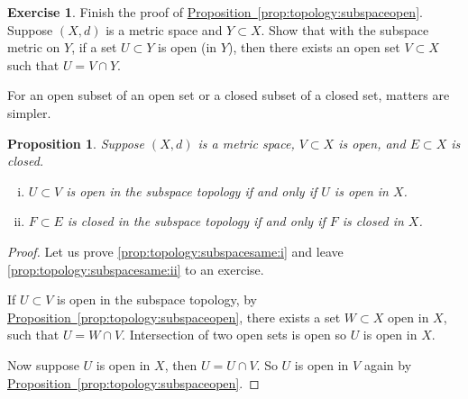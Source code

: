 \documentclass[12pt,openany]{book}
\theoremstyle{plain}
\newtheorem{prop}[thm]{Proposition}
\theoremstyle{remark}
\theoremstyle{definition}
\newenvironment{exbox}{%
    \def\FrameCommand{\vrule width 1pt \relax\hspace{10pt}}%
    \MakeFramed{\advance\hsize-\width\FrameRestore}%
}{%
    \endMakeFramed
}
\theoremstyle{exercise}
\newtheorem{exercise}{Exercise}[section]
\theoremstyle{example}
\newcommand{\propref}[1]{\hyperref[#1]{Proposition~\ref*{#1}}}
\begin{document}
\begin{exbox}
\begin{exercise}
Finish the proof of \propref{prop:topology:subspaceopen}.
Suppose $(X,d)$ is a metric space and $Y \subset X$.  Show that
with the subspace metric on $Y$, if a set $U \subset Y$
is open (in $Y$), then there exists an open set $V \subset X$ such
that $U = V \cap Y$.
\end{exercise}
\end{exbox}

For an open subset of an open set or a closed subset of a closed
set, matters are simpler.

\begin{prop} \label{prop:topology:subspacesame}
Suppose $(X,d)$ is a metric space, $V \subset X$ is open,
and $E \subset X$ is closed.
\begin{enumerate}[(i)]
\item \label{prop:topology:subspacesame:i}
$U \subset V$ is open in the subspace topology if and only if $U$ is open
in $X$.
\item \label{prop:topology:subspacesame:ii}
$F \subset E$ is closed in the subspace topology if and only if $F$ is
closed in $X$.
\end{enumerate}
\end{prop}

\begin{proof}
Let us prove
\ref{prop:topology:subspacesame:i}
and leave 
\ref{prop:topology:subspacesame:ii} to an exercise.

If $U \subset V$ is open in the subspace topology, by
\propref{prop:topology:subspaceopen}, there exists a set $W \subset X$
open in $X$, such that $U = W \cap V$.  Intersection of two open sets
is open so $U$ is open in $X$.

Now suppose $U$ is open in $X$, then $U = U \cap V$. So
$U$ is open in $V$ again by \propref{prop:topology:subspaceopen}.
\end{proof}
\end{document}
